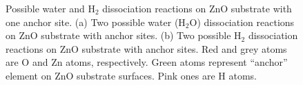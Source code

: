 \begingroup
\begin{figure}[!ht]
  \centering
  \label{Chap:Ag/ZnO:fig:12a}
  \label{Chap:Ag/ZnO:fig:12b}
\caption[Possible water and $\text{H}_{\text{2}}$ dissociation reactions on ZnO substrate with anchor sites.]{Possible water and $\text{H}_{\text{2}}$ dissociation reactions on ZnO substrate with one anchor site. (a) Two possible water ($\text{H}_{\text{2}}\text{O}$) dissociation reactions on ZnO substrate with anchor sites. (b) Two possible $\text{H}_{\text{2}}$ dissociation reactions on ZnO substrate with anchor sites. Red and grey atoms are O and Zn atoms, respectively. Green atoms represent ``anchor'' element on ZnO substrate surfaces. Pink ones are H atoms.}
\label{Chap:Ag/ZnO:fig12}
\end{figure}
\endgroup

